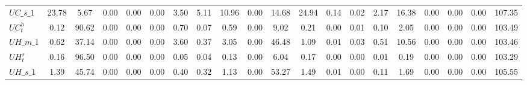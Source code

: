 \begin{center}
\begin{longtable}{lccccccccccccccccccc}
$UC\_s\_1                   $	 & 	               23.78	 & 	                5.67	 & 	                0.00	 & 	                0.00	 & 	                0.00	 & 	                3.50	 & 	                5.11	 & 	               10.96	 & 	                0.00	 & 	               14.68	 & 	               24.94	 & 	                0.14	 & 	                0.02	 & 	                2.17	 & 	               16.38	 & 	                0.00	 & 	                0.00	 & 	                0.00	 & 	              107.35 \\ 
$ UC^h_t                    $	 & 	                0.12	 & 	               90.62	 & 	                0.00	 & 	                0.00	 & 	                0.00	 & 	                0.70	 & 	                0.07	 & 	                0.59	 & 	                0.00	 & 	                9.02	 & 	                0.21	 & 	                0.00	 & 	                0.01	 & 	                0.10	 & 	                2.05	 & 	                0.00	 & 	                0.00	 & 	                0.00	 & 	              103.49 \\ 
$UH\_m\_1                   $	 & 	                0.62	 & 	               37.14	 & 	                0.00	 & 	                0.00	 & 	                0.00	 & 	                3.60	 & 	                0.37	 & 	                3.05	 & 	                0.00	 & 	               46.48	 & 	                1.09	 & 	                0.01	 & 	                0.03	 & 	                0.51	 & 	               10.56	 & 	                0.00	 & 	                0.00	 & 	                0.00	 & 	              103.46 \\ 
$  UH^s_t                   $	 & 	                0.16	 & 	               96.50	 & 	                0.00	 & 	                0.00	 & 	                0.00	 & 	                0.05	 & 	                0.04	 & 	                0.13	 & 	                0.00	 & 	                6.04	 & 	                0.17	 & 	                0.00	 & 	                0.00	 & 	                0.01	 & 	                0.19	 & 	                0.00	 & 	                0.00	 & 	                0.00	 & 	              103.29 \\ 
$UH\_s\_1                   $	 & 	                1.39	 & 	               45.74	 & 	                0.00	 & 	                0.00	 & 	                0.00	 & 	                0.40	 & 	                0.32	 & 	                1.13	 & 	                0.00	 & 	               53.27	 & 	                1.49	 & 	                0.01	 & 	                0.00	 & 	                0.11	 & 	                1.69	 & 	                0.00	 & 	                0.00	 & 	                0.00	 & 	              105.55 \\ 

\end{longtable}
\end{center}
